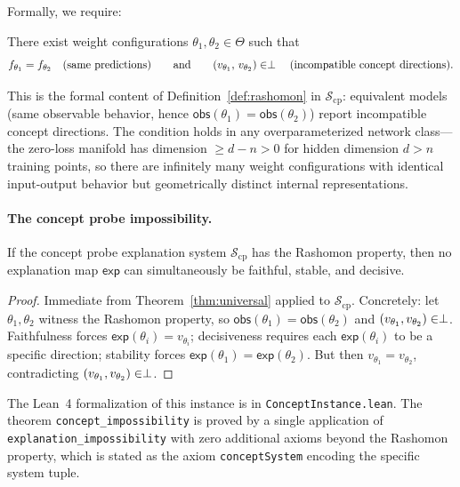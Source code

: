 Formally, we require:
\begin{definition}
There exist weight configurations $\theta_1, \theta_2 \in \Theta$ such that
\[
  f_{\theta_1} = f_{\theta_2}
  \quad \text{(same predictions)}
  \qquad \text{and} \qquad
  (v_{\theta_1},\, v_{\theta_2}) \in \perp
  \quad \text{(incompatible concept directions).}
\]
\end{definition}

This is the formal content of Definition~\ref{def:rashomon} in
$\mathcal{S}_{\mathrm{cp}}$: equivalent models (same observable behavior,
hence $\mathsf{obs}(\theta_1) = \mathsf{obs}(\theta_2)$) report incompatible
concept directions.  The condition holds in any overparameterized network
class---the zero-loss manifold has dimension $\geq d - n > 0$ for hidden
dimension $d > n$ training points, so there are infinitely many weight
configurations with identical input-output behavior but geometrically distinct
internal representations.

\paragraph{The concept probe impossibility.}

\begin{theorem}
\label{thm:concept-impossibility}
If the concept probe explanation system $\mathcal{S}_{\mathrm{cp}}$ has the
Rashomon property, then no explanation map $\mathsf{exp}$ can simultaneously
be faithful, stable, and decisive.
\end{theorem}

\begin{proof}
Immediate from Theorem~\ref{thm:universal} applied to
$\mathcal{S}_{\mathrm{cp}}$.  Concretely: let $\theta_1, \theta_2$ witness the
Rashomon property, so $\mathsf{obs}(\theta_1) = \mathsf{obs}(\theta_2)$ and
$(v_{\theta_1}, v_{\theta_2}) \in \perp$.  Faithfulness forces
$\mathsf{exp}(\theta_i) = v_{\theta_i}$; decisiveness requires each
$\mathsf{exp}(\theta_i)$ to be a specific direction; stability forces
$\mathsf{exp}(\theta_1) = \mathsf{exp}(\theta_2)$.  But then
$v_{\theta_1} = v_{\theta_2}$, contradicting $(v_{\theta_1}, v_{\theta_2}) \in
\perp$.
\end{proof}

The Lean~4 formalization of this instance is in
\texttt{ConceptInstance.lean}.  The theorem
\texttt{concept\_impossibility} is proved by a single application of
\texttt{explanation\_impossibility} with zero additional axioms beyond
the Rashomon property, which is stated as the axiom
\texttt{conceptSystem} encoding the specific system tuple.

